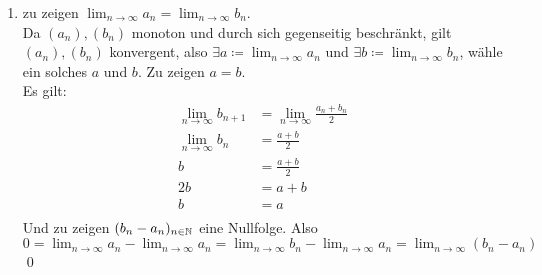 \documentclass{gadsescript}
\begin{document}
\begin{proof*}
\begin{enumerate}[label=(\alph*)]
\begin{enumerate}[label=(\roman*)]
\begin{description}
					\end{description}
				\item 
					\begin{align*}
						a_n &\leq 1 \cdot a_n\\
						a_n &\leq \frac{ 2b_n }{ b_n + b_n } a_n \quad | \quad \text{da } a_n + b_n \leq b_n + b_n \iff \frac{ 1 }{ b_n + b_n } \leq \frac{ 1 }{ a_n + b_n } \\
						a_n &\leq \frac{ 2b_n }{ a_n + b_n } a_n \\
						a_n &\leq a_{n + 1} \\
					\end{align*}
					\begin{align*}
						b_n &\geq 1 \cdot b_n\\
						b_n &\geq \frac{ 2b_n }{ 2 } \quad | \quad \text{da } a_n + b_n \leq b_n + b_n \\
						b_n &\geq \frac{ a_n + b_n }{ 2 } \\
						b_n &\geq b_{n + 1} \qed
					\end{align*}
				\item Also zu zeigen: $ \forall x \subset [a_{n+1}, b_{n+1}]: x \in [a_n, b_n] $.
					Sei $ x \in [a_{n+1}, b_{n+1}] $ gegeben, zu zeigen: $ x \in [a_n, b_n] $.\\
					Also zu zeigen $ a_n \leq x \leq b_n $. Es gilt, da $ x \in [a_{n+1}, b_{n+1}] $:
					$ a_n \leq a_{n+1} \leq x \leq b_{n+1} \leq b_n $\qed
			\end{enumerate}
		\item zu zeigen $ \lim_{n \to \infty} a_n = \lim_{n \to \infty} b_n $.\\
			Da $ (a_n), (b_n) $ monoton und durch sich gegenseitig beschränkt, gilt $ (a_n), (b_n) $ konvergent, also $ \exists a \coloneqq \lim_{n \to \infty} a_n $ und $ \exists b \coloneqq \lim_{n \to \infty} b_n $, wähle ein solches $ a $ und $ b $. Zu zeigen $ a = b $.\\
			Es gilt:
			\begin{align*}
				\lim_{n \to \infty} b_{n+1} &= \lim_{n \to \infty} \frac{ a_n + b_n }{ 2 }\\
				\lim_{n \to \infty} b_n &= \frac{ a + b }{ 2 }  \\
				b &= \frac{ a + b }{ 2 }  \\
				2b &= a + b \\
				b &= a\\
			\end{align*}
			Und zu zeigen $ (b_n - a_n)_{n \in \mathbb{N} } $ eine Nullfolge.
			Also $ 0 = \lim_{n \to \infty} a_n - \lim_{n \to \infty} a_n = \lim_{n \to \infty} b_n - \lim_{n \to \infty} a_n = \lim_{n \to \infty} (b_n - a_n)  $\qed

\end{enumerate}
\end{proof*}
\end{document}
